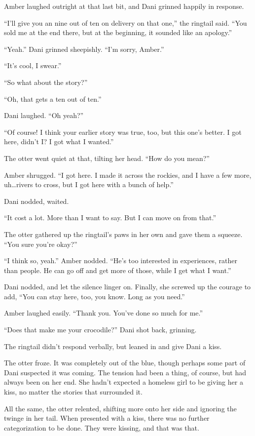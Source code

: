 Amber laughed outright at that last bit, and Dani grinned happily in response.

``I'll give you an nine out of ten on delivery on that one,'' the ringtail said. ``You sold me at the end there, but at the beginning, it sounded like an apology.''

``Yeah.'' Dani grinned sheepishly. ``I'm sorry, Amber.''

``It's cool, I swear.''

``So what about the story?''

``Oh, that gets a ten out of ten.''

Dani laughed. ``Oh yeah?''

``Of course! I think your earlier story was true, too, but this one's better. I got here, didn't I? I got what I wanted.''

The otter went quiet at that, tilting her head. ``How do you mean?''

Amber shrugged. ``I got here. I made it across the rockies, and I have a few more, uh\ldots{}rivers to cross, but I got here with a bunch of help.''

Dani nodded, waited.

``It cost a lot. More than I want to say. But I can move on from that.''

The otter gathered up the ringtail's paws in her own and gave them a squeeze. ``You sure you're okay?''

``I think so, yeah.'' Amber nodded. ``He's too interested in experiences, rather than people. He can go off and get more of those, while I get what I want.''

Dani nodded, and let the silence linger on. Finally, she screwed up the courage to add, ``You can stay here, too, you know. Long as you need.''

Amber laughed easily. ``Thank you. You've done so much for me.''

``Does that make me your crocodile?'' Dani shot back, grinning.

The ringtail didn't respond verbally, but leaned in and give Dani a kiss.

The otter froze. It was completely out of the blue, though perhaps some part of Dani suspected it was coming. The tension had been a thing, of course, but had always been on her end. She hadn't expected a homeless girl to be giving her a kiss, no matter the stories that surrounded it.

All the same, the otter relented, shifting more onto her side and ignoring the twinge in her tail. When presented with a kiss, there was no further categorization to be done. They were kissing, and that was that.

